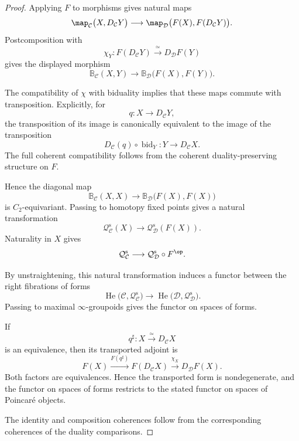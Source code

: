 \begin{proof}
Applying $F$ to morphisms gives natural maps
\[
\begin{aligned}
    \map_{\mathcal C}
    \bigl(
        X,
        D_{\mathcal C}Y
    \bigr)
    \longrightarrow
    \map_{\mathcal D}
    \bigl(
        F(X),
        F(D_{\mathcal C}Y)
    \bigr).
\end{aligned}
\]
Postcomposition with
\[
    \chi_Y
    \colon
    F(D_{\mathcal C}Y)
    \xrightarrow{\;\simeq\;}
    D_{\mathcal D}F(Y)
\]
gives the displayed morphism
\[
    \mathbb B_{\mathcal C}(X,Y)
    \longrightarrow
    \mathbb B_{\mathcal D}
    \bigl(
        F(X),
        F(Y)
    \bigr).
\]

The compatibility of $\chi$ with biduality implies that these maps commute
with transposition. Explicitly, for
\[
    q
    \colon
    X
    \longrightarrow
    D_{\mathcal C}Y,
\]
the transposition of its image is canonically equivalent to the image of
the transposition
\[
    D_{\mathcal C}(q)
    \circ
    \operatorname{bid}_Y
    \colon
    Y
    \longrightarrow
    D_{\mathcal C}X.
\]
The full coherent compatibility follows from the coherent
duality-preserving structure on $F$.

Hence the diagonal map
\[
    \mathbb B_{\mathcal C}(X,X)
    \longrightarrow
    \mathbb B_{\mathcal D}
    \bigl(
        F(X),
        F(X)
    \bigr)
\]
is $C_2$-equivariant. Passing to homotopy fixed points gives a natural
transformation
\[
    \mathcal Q_{\mathcal C}^{\mathrm s}(X)
    \longrightarrow
    \mathcal Q_{\mathcal D}^{\mathrm s}(F(X)).
\]
Naturality in $X$ gives
\[
    \mathcal Q_{\mathcal C}^{\mathrm s}
    \longrightarrow
    \mathcal Q_{\mathcal D}^{\mathrm s}
    \circ
    F^{\op}.
\]

By unstraightening, this natural transformation induces a functor between
the right fibrations of forms
\[
    \operatorname{He}
    \bigl(
        \mathcal C,
        \mathcal Q_{\mathcal C}^{\mathrm s}
    \bigr)
    \longrightarrow
    \operatorname{He}
    \bigl(
        \mathcal D,
        \mathcal Q_{\mathcal D}^{\mathrm s}
    \bigr).
\]
Passing to maximal $\infty$-groupoids gives the functor on spaces of
forms.

If
\[
    q^\sharp
    \colon
    X
    \xrightarrow{\;\simeq\;}
    D_{\mathcal C}X
\]
is an equivalence, then its transported adjoint is
\[
    F(X)
    \xrightarrow{F(q^\sharp)}
    F(D_{\mathcal C}X)
    \xrightarrow{\chi_X}
    D_{\mathcal D}F(X).
\]
Both factors are equivalences. Hence the transported form is
nondegenerate, and the functor on spaces of forms restricts to the stated
functor on spaces of Poincaré objects.

The identity and composition coherences follow from the corresponding
coherences of the duality comparisons.
\end{proof}


